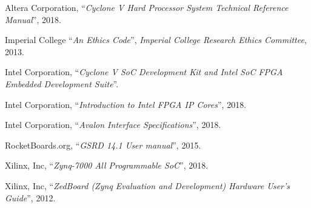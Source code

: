 \begin{thebibliography}{1}
  Altera Corporation,
  ``\textit{Cyclone V Hard Processor System Technical Reference Manual}'',
  2018.

  Imperial College
  ``\textit{An Ethics Code}'',
  \textit{Imperial College Research Ethics Committee},
  2013.

  Intel Corporation,
  ``\textit{Cyclone V SoC Development Kit and Intel SoC FPGA Embedded
  Development Suite}''.

  Intel Corporation,
  ``\textit{Introduction to Intel FPGA IP Cores}'',
  2018.

  Intel Corporation,
  ``\textit{Avalon Interface Specifications}'',
  2018.

  RocketBoards.org,
  ``\textit{GSRD 14.1 User manual}'',
  2015.

  Xilinx, Inc,
  ``\textit{Zynq-7000 All Programmable SoC}'',
  2018.

  Xilinx, Inc,
  ``\textit{ZedBoard (Zynq Evaluation and Development) Hardware User's Guide}'',
  2012.
\end{thebibliography}